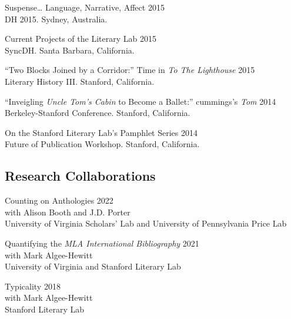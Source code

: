 \documentclass[
  12pt,
  letterpaper,
]{article}
\begin{document}
Suspense\ldots{} Language, Narrative, Affect \hfill 2015\\
\hspace*{0.333em} DH 2015. Sydney, Australia.

Current Projects of the Literary Lab \hfill 2015\\
\hspace*{0.333em} SyncDH. Santa Barbara, California.

``Two Blocks Joined by a Corridor:'' Time in \emph{To The Lighthouse}
\hfill 2015\\
\hspace*{0.333em} Literary History III. Stanford, California.

``Inveigling \emph{Uncle Tom's Cabin} to Become a Ballet:'' cummings's
\emph{Tom} \hfill 2014\\
\hspace*{0.333em} Berkeley-Stanford Conference. Stanford, California.

On the Stanford Literary Lab's Pamphlet Series \hfill 2014\\
\hspace*{0.333em} Future of Publication Workshop. Stanford, California.

\hypertarget{research-collaborations}{%
\subsection{Research Collaborations}\label{research-collaborations}}

Counting on Anthologies \hfill 2022\\
\hspace*{0.333em} with Alison Booth and J.D. Porter\\
\hspace*{0.333em} University of Virginia Scholars' Lab and University of
Pennsylvania Price Lab

Quantifying the \emph{MLA International Bibliography} \hfill 2021\\
\hspace*{0.333em} with Mark Algee-Hewitt\\
\hspace*{0.333em} University of Virginia and Stanford Literary Lab

Typicality \hfill 2018\\
\hspace*{0.333em} with Mark Algee-Hewitt\\
\hspace*{0.333em} Stanford Literary Lab
\end{document}
